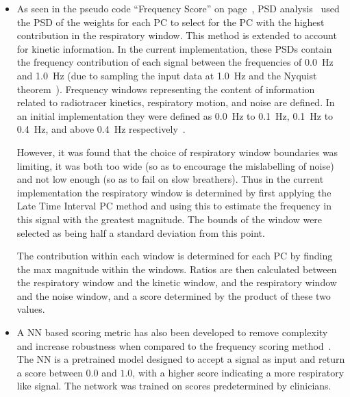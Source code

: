                     \begin{itemize}
                        \item As seen in the pseudo code ``Frequency Score'' on page~\pageref{alg:pca_data_driven_surrogate_signal_extraction_methods_for_dynamic_pet_methods_score_select_and_combine_method_score_and_select_frequency_score_pseudo_code}, \gls{PSD} analysis~\parencite{Thielemans2011} used the \gls{PSD} of the weights for each \gls{PC} to select for the \gls{PC} with the highest contribution in the respiratory window. This method is extended to account for kinetic information. In the current implementation, these \glspl{PSD} contain the frequency contribution of each signal between the frequencies of \SI{0.0}{\hertz} and \SI{1.0}{\hertz} (due to sampling the input data at \SI{1.0}{\hertz} and the Nyquist theorem~\parencite{Whittaker1915OnInterpolation-Theory, Nyquist1928CertainTheory, Shannon1949CommunicationNoise}). Frequency windows representing the content of information related to radiotracer kinetics, respiratory motion, and noise are defined. In an initial implementation they were defined as \SI{0.0}{\hertz} to \SI{0.1}{\hertz}, \SI{0.1}{\hertz} to \SI{0.4}{\hertz}, and above \SI{0.4}{\hertz} respectively~\parencite{Bertolli2017}.
                        
                        However, it was found that the choice of respiratory window boundaries was limiting, it was both too wide (so as to encourage the mislabelling of noise) and not low enough (so as to fail on slow breathers). Thus in the current implementation the respiratory window is determined by first applying the Late Time Interval \gls{PC} method and using this to estimate the frequency in this signal with the greatest magnitude. The bounds of the window were selected as being half a standard deviation from this point.
                        
                        The contribution within each window is determined for each \gls{PC} by finding the max magnitude within the windows. Ratios are then calculated between the respiratory window and the kinetic window, and the respiratory window and the noise window, and a score determined by the product of these two values.
                            
                        \item %
                        A \gls{NN} based scoring metric has also been developed to remove complexity and increase robustness when compared to the frequency scoring method~\parencite{Walker2020AutomaticAI}. %
                        The \gls{NN} is a pretrained model designed to accept a signal as input and return a score between $0.0$ and $1.0$, with a higher score indicating a more respiratory like signal. The network was trained on  scores predetermined by clinicians.
                    \end{itemize}
                    
